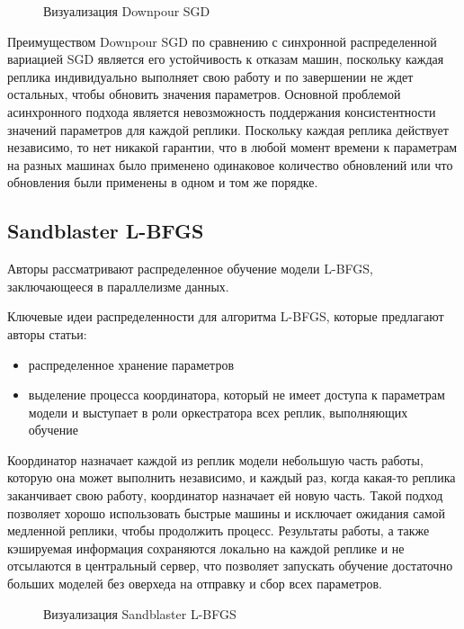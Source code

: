 \begin{figure}[h]%
	\centering
	\caption{Визуализация Downpour SGD}
	\label{framework} %
\end{figure}

\indent\setlength{\parindent}{1em} 
Преимуществом Downpour SGD по сравнению с синхронной распределенной вариацией SGD является его устойчивость к отказам машин, поскольку каждая реплика индивидуально выполняет свою работу и по завершении не ждет остальных, чтобы обновить значения параметров. Основной проблемой асинхронного подхода является невозможность поддержания консистентности значений параметров для каждой реплики. Поскольку каждая реплика действует независимо, то нет никакой гарантии, что в любой момент времени к параметрам на разных машинах было применено одинаковое количество обновлений или что обновления были применены в одном и том же порядке.

\subsection{Sandblaster L-BFGS}
\indent\setlength{\parindent}{1em} 
Авторы рассматривают распределенное обучение модели L-BFGS, заключающееся в параллелизме данных.  

\indent\setlength{\parindent}{1em} 
Ключевые идеи распределенности для алгоритма L-BFGS, которые предлагают авторы статьи:
\begin{itemize}
  \item распределенное хранение параметров 
  \item выделение процесса координатора, который не имеет доступа к параметрам модели и выступает в роли оркестратора всех реплик, выполняющих обучение
\end{itemize}

\indent\setlength{\parindent}{1em} 
Координатор назначает каждой из реплик модели небольшую часть работы, которую она может выполнить независимо, и каждый раз, когда какая-то реплика заканчивает свою работу, координатор назначает ей новую часть. Такой подход позволяет хорошо использовать быстрые машины и исключает ожидания самой медленной реплики, чтобы продолжить процесс. Результаты работы, а также кэшируемая информация сохраняются локально на каждой реплике и не отсылаются в центральный сервер, что позволяет запускать обучение достаточно больших моделей без оверхеда на отправку и сбор всех параметров. 

\begin{figure}[h]%
	\centering
	\caption{Визуализация Sandblaster L-BFGS}
	\label{framework} %
\end{figure}

